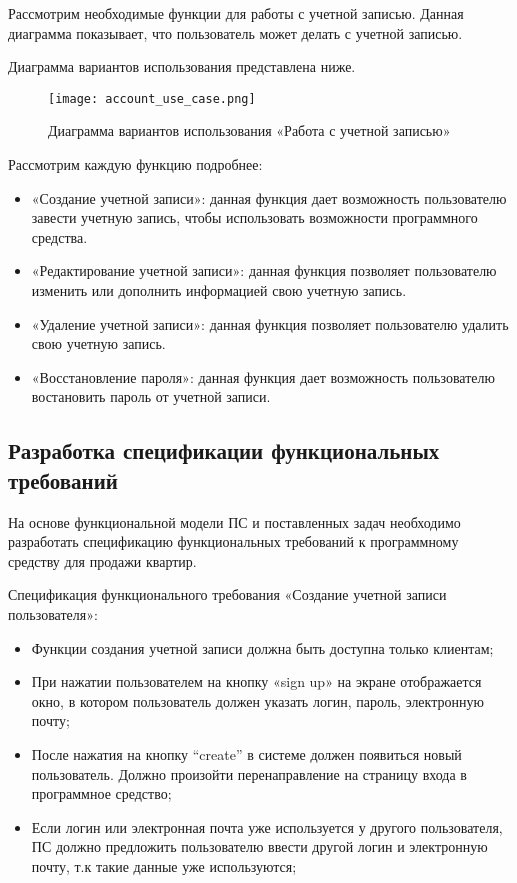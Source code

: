 Рассмотрим необходимые функции для работы с учетной записью. Данная диаграмма показывает, что пользователь может делать с учетной записью. 

Диаграмма вариантов использования представлена ниже.

\begin{figure}[!htb]
	\centering
	\texttt{[image: account\_use\_case.png]}
	\caption{ Диаграмма вариантов использования «Работа с учетной записью»}
	\label{fig:arch_and_mod::lexer_flow}
	\clearpage
\end{figure}

Рассмотрим каждую функцию подробнее:

\begin{itemize}
	\item «Создание учетной записи»: данная функция дает возможность пользователю завести учетную запись, чтобы использовать возможности программного средства.
	\item «Редактирование учетной записи»: данная функция позволяет пользователю изменить или дополнить информацией свою учетную запись.
	\item «Удаление учетной записи»: данная функция позволяет пользователю удалить свою учетную запись.
	\item «Восстановление пароля»: данная функция дает возможность пользователю востановить пароль от учетной записи. 
\end{itemize}

\subsection{Разработка спецификации функциональных требований}

На основе функциональной модели ПС и поставленных задач необходимо разработать спецификацию функциональных требований к программному средству для продажи квартир.

Спецификация функционального требования «Создание учетной записи пользователя»:

\begin{itemize}
	\item Функции создания учетной записи должна быть доступна только клиентам;
	\item При нажатии пользователем на кнопку «sign up» на экране отображается окно, в котором пользователь должен указать логин, пароль, электронную почту;
	\item  После нажатия на кнопку “create” в системе должен появиться новый пользователь. Должно произойти перенаправление на страницу входа в программное средство; 
	\item Если логин или электронная почта уже используется у другого пользователя, ПС должно предложить пользователю ввести другой логин и электронную почту, т.к такие данные уже используются;
\end{itemize}

